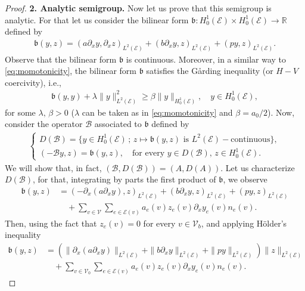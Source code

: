 \documentclass[10pt,a4paper]{amsart}
\def\R{\mathbb R}
\def\to{\rightarrow}
\begin{document}
\begin{proof}
\smallskip
\noindent
\textbf{2. Analytic semigroup.}
Now let us prove that this semigroup is analytic. For that let us consider the bilinear form $\mathfrak{b}:H_0^1(\mathcal{E})\times H_0^1(\mathcal{E})\to \R$ defined by     \begin{align}\label{eq:bilinear_form_b}
    \mathfrak{b}(y,z)= (a\partial_x y,\partial_xz )_{L^2(\mathcal{E})} +(b\partial_x y,z)_{L^2(\mathcal{E})} + (py,z)_{L^2(\mathcal{E})}.
\end{align}
Observe that the bilinear form $\mathfrak{b}$ is continuous. Moreover, in a similar way to \eqref{eq:momotonicity}, the bilinear form $\mathfrak{b}$ satisfies the Gårding inequality (or $H-V$ coercivity), i.e.,
\begin{align}\label{eq:VHcoercitivity}
\mathfrak{b}(y,y) +\lambda\| y\|^2_{L^2(\mathcal{E})} \geq \beta\|y \|_{H_0^1(\mathcal{E})},\quad y\in H^1_0(\mathcal{E}),
\end{align}
for some $\lambda,\,\beta>0$ ($\lambda$ can be taken as in \eqref{eq:momotonicity} and $\beta =a_0/2$). Now, consider the operator $\mathfrak{\mathcal{B}}$ associated to $\mathfrak{b}$
 defined by 
 \begin{align*}
     \begin{cases}
         D(\mathfrak{\mathcal{B}}) = \{y\in H_0^1(\mathcal{E})\,;\, z\mapsto \mathfrak{b}(y,z) \text{ is } L^2(\mathcal{E}) -\text{continuous}\},\\
         (-\mathfrak{\mathcal{B}}y,z)=\mathfrak{b}(y,z),\quad \text{for every }y\in D(\mathfrak{\mathcal{B}}),\, z\in H_0^1(\mathcal{E}). 
     \end{cases}
 \end{align*}
We will show that, in fact, $(\mathfrak{\mathcal{B}},D(\mathfrak{\mathcal{B}})) =(A,D(A))$. Let us characterize $D(\mathfrak{\mathcal{B}})$, for that, integrating by parts the first product of $\mathfrak{b}$, we observe
\begin{align}\label{eq:first_integration_bilinear}
   \nonumber \mathfrak{b}(y,z) &= (-\partial_x (a\partial_x y),z)_{L^2(\mathcal{E})}+(b\partial_x y,z)_{L^2(\mathcal{E})} +(p y,z)_{L^2(\mathcal{E})}\\ &\quad+\sum_{v\in\mathcal{V}}\sum_{e\in\mathcal{E}(v)}a_e(v)z_e(v)\partial_x y_e(v)n_e(v). 
\end{align}
Then, using the fact that $z_e(v)=0$ for every $v\in\mathcal{V}_b$, and applying H\"older's inequality 
\begin{align*}
    \mathfrak{b}(y,z) &= \left(\|\partial_x (a\partial_x y)\|_{L^2(\mathcal{E})}+\|b\partial_x y\|_{L^2(\mathcal{E})} +\|p y\|_{L^2(\mathcal{E})}\right)\|z\|_{L^2(\mathcal{E})}\\ &\quad+\sum_{v\in\mathcal{V}_0}\sum_{e\in\mathcal{E}(v)}a_e(v)z_e(v)\partial_x y_e(v)n_e(v). 

\end{align*}
\end{proof}
\end{document}
